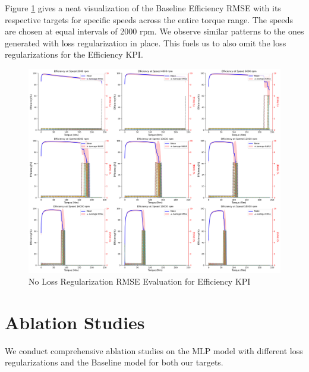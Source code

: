 \documentclass{report} %
\begin{document}
Figure \ref{fig:No Loss Regularization RMSE Evaluation for Efficiency KPI} gives a neat visualization of the Baseline Efficiency \ac{RMSE} with its respective targets 
for specific speeds across the entire torque range. The speeds are chosen at equal intervals of 2000 rpm.
We observe similar patterns to the ones generated with loss regularization in place. This fuels us to also omit the loss regularizations for the Efficiency \ac{KPI}.
\begin{figure}[H]
    \centering
    \includegraphics[width=1\textwidth]{./ReportImages/rmse_eta_no_lossreg_MLP.png} 
    \caption{No Loss Regularization \ac{RMSE} Evaluation for Efficiency \ac{KPI}} 
    \label{fig:No Loss Regularization RMSE Evaluation for Efficiency KPI}
\end{figure}

\section{Ablation Studies}\label{sec:Ablation Studies}

We conduct comprehensive ablation studies on the \ac{MLP} model with different loss regularizations and the Baseline model for both our targets.
\end{document}
